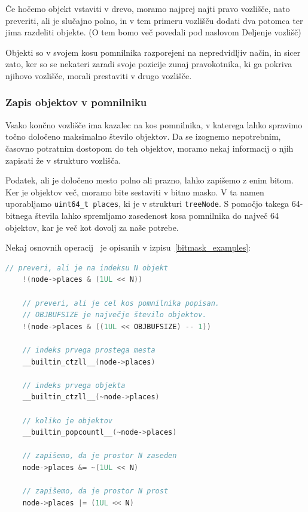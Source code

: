\documentclass[a4paper,12pt]{article}
\begin{document}
Če hočemo objekt vstaviti v drevo, moramo najprej najti pravo vozlišče, nato preveriti,
ali je slučajno polno, in v tem primeru vozlišču dodati dva potomca ter jima razdeliti objekte.
(O tem bomo več povedali pod naslovom Deljenje vozlišč)

Objekti so v svojem kosu pomnilnika razporejeni na nepredvidljiv način, in sicer zato, ker so se nekateri
zaradi svoje pozicije zunaj pravokotnika, ki ga pokriva njihovo vozlišče, morali prestaviti v drugo vozlišče.

\subsubsection{Zapis objektov v pomnilniku}
Vsako končno vozlišče ima kazalec na kos pomnilnika, v katerega lahko spravimo
točno določeno maksimalno število objektov. Da se izognemo nepotrebnim, časovno potratnim dostopom
do teh objektov, moramo nekaj informacij o njih zapisati že v strukturo vozlišča.

Podatek, ali je določeno mesto polno ali prazno, lahko zapišemo z enim bitom. Ker je objektov več,
moramo bite sestaviti v bitno masko. V ta namen uporabljamo \lstinline|uint64_t places|, ki je v strukturi 
\lstinline|treeNode|. S pomočjo takega 64-bitnega števila lahko spremljamo zasedenost kosa pomnilnika 
do največ 64 objektov, kar je več kot dovolj za naše potrebe.

\newpage
Nekaj osnovnih operacij~\cite{gcc_documentation} je opisanih v izpisu~\ref{bitmask_examples}:
\begin{lstlisting}[caption={Uporaba bitne maske za objekte}, label=bitmask_examples, language=C]
    // preveri, ali je na indeksu N objekt
    !(node->places & (1UL << N))

    // preveri, ali je cel kos pomnilnika popisan.
    // OBJBUFSIZE je največje število objektov.
    !(node->places & ((1UL << OBJBUFSIZE) -- 1)) 

    // indeks prvega prostega mesta
    __builtin_ctzll__(node->places)

    // indeks prvega objekta
    __builtin_ctzll__(~node->places)

    // koliko je objektov
    __builtin_popcountl__(~node->places)

    // zapišemo, da je prostor N zaseden
    node->places &= ~(1UL << N)

    // zapišemo, da je prostor N prost
    node->places |= (1UL << N)

\end{lstlisting}
\end{document}
